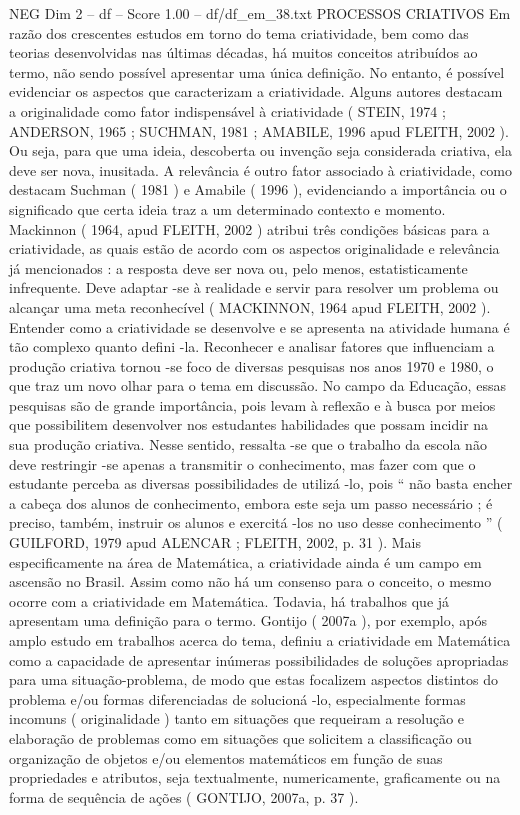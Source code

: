 \begin{textsample}{NEG Dim 2 – df – Score 1.00 – df/df\_em\_38.txt}  \label{ex:f2_neg_170}
PROCESSOS CRIATIVOS Em razão dos crescentes estudos em torno do tema criatividade, bem como das teorias desenvolvidas nas últimas décadas, há muitos conceitos atribuídos ao termo, não sendo possível apresentar uma única definição.
No entanto, é possível evidenciar os aspectos que caracterizam a criatividade.
Alguns autores destacam a originalidade como fator indispensável à criatividade ( STEIN, 1974 ; ANDERSON, 1965 ; SUCHMAN, 1981 ; AMABILE, 1996 apud FLEITH, 2002 ).
Ou seja, para que uma ideia, descoberta ou invenção seja considerada criativa, ela deve ser nova, inusitada.
A relevância é outro fator associado à criatividade, como destacam Suchman ( 1981 ) e Amabile ( 1996 ), evidenciando a importância ou o significado que certa ideia traz a um determinado contexto e momento.
Mackinnon ( 1964, apud FLEITH, 2002 ) atribui três condições básicas para a criatividade, as quais estão de acordo com os aspectos originalidade e relevância já mencionados : a resposta deve ser nova ou, pelo menos, estatisticamente infrequente.
Deve adaptar -se à realidade e servir para resolver um problema ou alcançar uma meta reconhecível ( MACKINNON, 1964 apud FLEITH, 2002 ).
Entender como a criatividade se desenvolve e se apresenta na atividade humana é tão complexo quanto defini -la.
Reconhecer e analisar fatores que influenciam a produção criativa tornou -se foco de diversas pesquisas nos anos 1970 e 1980, o que traz um novo olhar para o tema em discussão.
No campo da Educação, essas pesquisas são de grande importância, pois levam à reflexão e à busca por meios que possibilitem desenvolver nos estudantes habilidades que possam incidir na sua produção criativa.
Nesse sentido, ressalta -se que o trabalho da escola não deve restringir -se apenas a transmitir o conhecimento, mas fazer com que o estudante perceba as diversas possibilidades de utilizá -lo, pois “ não basta encher a cabeça dos alunos de conhecimento, embora este seja um passo necessário ; é preciso, também, instruir os alunos e exercitá -los no uso desse conhecimento ” ( GUILFORD, 1979 apud ALENCAR ; FLEITH, 2002, p. 31 ).
Mais especificamente na área de Matemática, a criatividade ainda é um campo em ascensão no Brasil.
Assim como não há um consenso para o conceito, o mesmo ocorre com a criatividade em Matemática.
Todavia, há trabalhos que já apresentam uma definição para o termo.
Gontijo ( 2007a ), por exemplo, após amplo estudo em trabalhos acerca do tema, definiu a criatividade em Matemática como a capacidade de apresentar inúmeras possibilidades de soluções apropriadas para uma situação-problema, de modo que estas focalizem aspectos distintos do problema e/ou formas diferenciadas de solucioná -lo, especialmente formas incomuns ( originalidade ) tanto em situações que requeiram a resolução e elaboração de problemas como em situações que solicitem a classificação ou organização de objetos e/ou elementos matemáticos em função de suas propriedades e atributos, seja textualmente, numericamente, graficamente ou na forma de sequência de ações ( GONTIJO, 2007a, p. 37 ).

\end{textsample}

